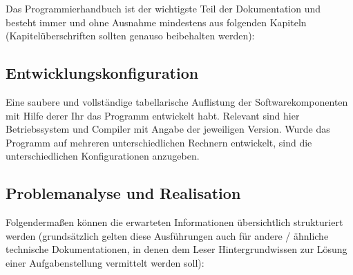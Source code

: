\documentclass[12pt, letterpaper, twoside]{article}
\begin{document}
        Das Programmierhandbuch ist der wichtigste Teil der Dokumentation und besteht immer und ohne Ausnahme mindestens aus folgenden Kapiteln (Kapitelüberschriften sollten genauso beibehalten werden):

        \subsection{Entwicklungskonfiguration}
            Eine saubere und vollständige tabellarische Auflistung der Softwarekomponenten mit Hilfe derer Ihr das Programm entwickelt habt. Relevant sind hier Betriebssystem und Compiler mit Angabe der jeweiligen Version. Wurde das Programm auf mehreren unterschiedlichen Rechnern entwickelt, sind die unterschiedlichen Konfigurationen anzugeben.
        
        \subsection{Problemanalyse und Realisation}
            Folgendermaßen können die erwarteten Informationen übersichtlich strukturiert werden (grundsätzlich gelten diese Ausführungen auch für andere / ähnliche technische Dokumentationen, in denen dem Leser Hintergrundwissen zur Lösung einer Aufgabenstellung vermittelt werden soll):
\end{document}
